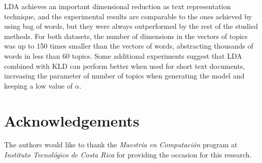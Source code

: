 \documentclass[preprint,12pt,3p]{elsarticle}
\begin{document}
LDA achieves an important dimensional reduction as text representation technique, and the experimental results are comparable to the ones achieved by using bag of words, but they were always outperformed by the rest of the studied methods. For both datasets, the number of dimensions in the vectors of topics was up to 150 times smaller than the vectors of words, abstracting thousands of words in less than 60 topics. Some additional experiments suggest that LDA combined with KLD can perform better when used for short text documents, increasing the parameter of number of topics when generating the model and keeping a low value of $\alpha$.\par

\section{Acknowledgements}
\label{acknowledgements}

The authors would like to thank the \textit{Maestr\'{i}a en Computaci\'{o}n} program at \textit{Instituto Tecnol\'{o}gico de Costa Rica} for providing the occasion for this research.







% 
% 
% 
% 
% 
% 
% 
% 
% 
% 
% 
% 


\end{document}
